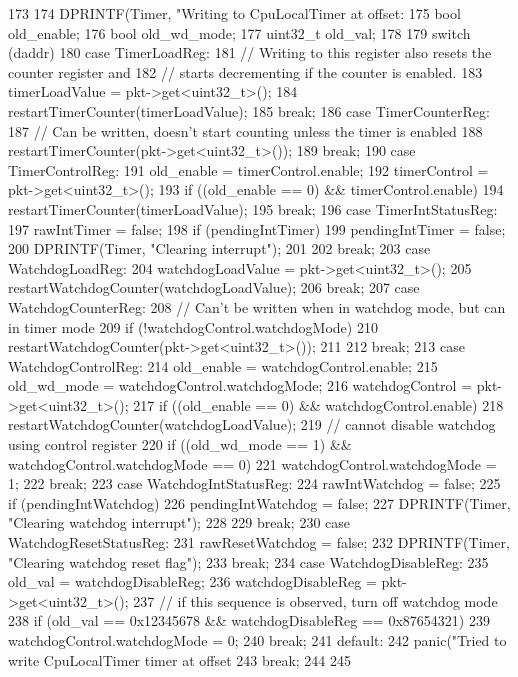 \begin{DoxyCode}
173 {
174     DPRINTF(Timer, "Writing to CpuLocalTimer at offset: %
175     bool old_enable;
176     bool old_wd_mode;
177     uint32_t old_val;
178 
179     switch (daddr) {
180       case TimerLoadReg:
181         // Writing to this register also resets the counter register and
182         // starts decrementing if the counter is enabled.
183         timerLoadValue = pkt->get<uint32_t>();
184         restartTimerCounter(timerLoadValue);
185         break;
186       case TimerCounterReg:
187         // Can be written, doesn't start counting unless the timer is enabled
188         restartTimerCounter(pkt->get<uint32_t>());
189         break;
190       case TimerControlReg:
191         old_enable = timerControl.enable;
192         timerControl = pkt->get<uint32_t>();
193         if ((old_enable == 0) && timerControl.enable)
194             restartTimerCounter(timerLoadValue);
195         break;
196       case TimerIntStatusReg:
197         rawIntTimer = false;
198         if (pendingIntTimer) {
199             pendingIntTimer = false;
200             DPRINTF(Timer, "Clearing interrupt\n");
201         }
202         break;
203       case WatchdogLoadReg:
204         watchdogLoadValue = pkt->get<uint32_t>();
205         restartWatchdogCounter(watchdogLoadValue);
206         break;
207       case WatchdogCounterReg:
208         // Can't be written when in watchdog mode, but can in timer mode
209         if (!watchdogControl.watchdogMode) {
210             restartWatchdogCounter(pkt->get<uint32_t>());
211         }
212         break;
213       case WatchdogControlReg:
214         old_enable = watchdogControl.enable;
215         old_wd_mode = watchdogControl.watchdogMode;
216         watchdogControl = pkt->get<uint32_t>();
217         if ((old_enable == 0) && watchdogControl.enable)
218             restartWatchdogCounter(watchdogLoadValue);
219         // cannot disable watchdog using control register
220         if ((old_wd_mode == 1) && watchdogControl.watchdogMode == 0)
221             watchdogControl.watchdogMode = 1;
222         break;
223       case WatchdogIntStatusReg:
224         rawIntWatchdog = false;
225         if (pendingIntWatchdog) {
226             pendingIntWatchdog = false;
227             DPRINTF(Timer, "Clearing watchdog interrupt\n");
228         }
229         break;
230       case WatchdogResetStatusReg:
231         rawResetWatchdog = false;
232         DPRINTF(Timer, "Clearing watchdog reset flag\n");
233         break;
234       case WatchdogDisableReg:
235         old_val = watchdogDisableReg;
236         watchdogDisableReg = pkt->get<uint32_t>();
237         // if this sequence is observed, turn off watchdog mode
238         if (old_val == 0x12345678 && watchdogDisableReg == 0x87654321)
239             watchdogControl.watchdogMode = 0;
240         break;
241       default:
242         panic("Tried to write CpuLocalTimer timer at offset %
243         break;
244     }
245 }
\end{DoxyCode}


